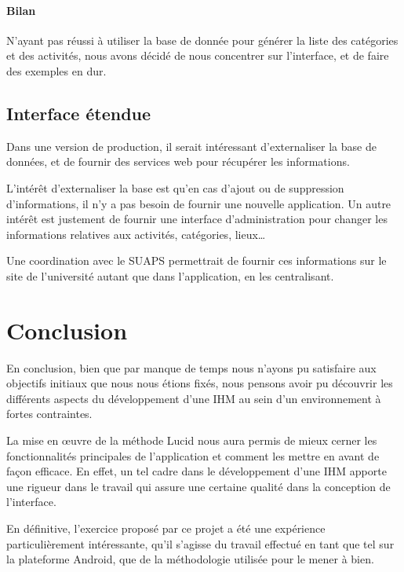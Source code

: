 \documentclass[french, titlepage, 11pt, a4paper]{article}
\begin{document}
        \paragraph{Bilan} N'ayant pas réussi à utiliser la base de donnée pour
        générer la liste des catégories et des activités, nous avons décidé de
        nous concentrer sur l'interface, et de faire des exemples en dur.


    \subsection{Interface étendue}

        Dans une version de production, il serait intéressant d'externaliser la
        base de données, et de fournir des services web pour récupérer les
        informations.

        L'intérêt d'externaliser la base est qu'en cas d'ajout ou de suppression
        d'informations, il n'y a pas besoin de fournir une nouvelle application.
        Un autre intérêt est justement de fournir une interface d'administration
        pour changer les informations relatives aux activités, catégories,
        lieux\dots

        Une coordination avec le SUAPS permettrait de fournir ces informations
        sur le site de l'université autant que dans l'application, en les centralisant.


\section*{Conclusion}

En conclusion, bien que par manque de temps nous n'ayons pu satisfaire aux
objectifs initiaux que nous nous étions fixés, nous pensons avoir pu découvrir
les différents aspects du développement d'une IHM au sein d'un environnement à
fortes contraintes.

La mise en œuvre de la méthode Lucid nous aura permis de mieux cerner
les fonctionnalités principales de l'application et comment les mettre en avant
de façon efficace.
En effet, un tel cadre dans le développement d'une IHM apporte une rigueur dans
le travail qui assure une certaine qualité dans la conception de l'interface.

En définitive, l'exercice proposé par ce projet a été une expérience
particulièrement intéressante, qu'il s'agisse du travail effectué en tant que
tel sur la plateforme Android, que de la méthodologie utilisée pour le mener à
bien.
\end{document}
